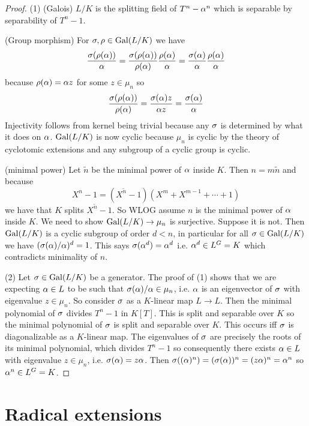 \documentclass{article}
\begin{document}
\begin{proof}
  (1) (Galois)
  $L / K$ is the splitting field of $T^n - \alpha^n$
  which is separable by separability of $T^n - 1$.

  (Group morphism)
  For $\sigma , \rho \in \operatorname{Gal}(L / K)$
  we have \[
    \frac{\sigma(\rho(\alpha))}{\alpha} 
    = \frac{\sigma(\rho(\alpha))}{\rho(\alpha)} \frac{\rho(\alpha)}{\alpha}
    = \frac{\sigma(\alpha)}{\alpha} \frac{\rho(\alpha)}{\alpha}
  \]
  because $\rho(\alpha) = \alpha z$ for some $z \in \mu_n$ so \[
    \frac{\sigma(\rho(\alpha))}{\rho(\alpha)}
    = \frac{\sigma(\alpha) z}{\alpha z} = \frac{\sigma(\alpha)}{\alpha}
  \]
  Injectivity follows from kernel being trivial
  because any $\sigma$ is determined by what it does on $\alpha$.
  $\operatorname{Gal}(L/K)$ is now cyclic because $\mu_n$ is cyclic by
  the theory of cyclotomic extensions and 
  any subgroup of a cyclic group is cyclic.

  (minimal power)
  Let $\tilde{n}$ be the minimal power of $\alpha$ inside $K$.
  Then $n = m \tilde{n}$ and because \[
    X^n - 1 = (X^{\tilde{n}} - 1)(X^m + X^{m - 1} + \cdots + 1)
  \]
  we have that $K$ splits $X^{\tilde{n}} - 1$.
  So WLOG assume $n$ is the minimal power of $\alpha$ inside $K$.
  We need to show $\operatorname{Gal}(L / K) \to \mu_n$ is surjective.
  Suppose it is not.
  Then $\operatorname{Gal}(L / K)$ is a cyclic subgroup of order $d < n$,
  in particular for all $\sigma \in \operatorname{Gal}(L / K)$ we have $(\sigma(\alpha) / \alpha)^d = 1$.
  This says $\sigma(\alpha^d) = \alpha^d$ i.e. $\alpha^d \in L^G = K$
  which contradicts minimality of $n$.

  (2) Let $\sigma \in \operatorname{Gal}(L / K)$ be a generator.
  The proof of (1) shows that we are expecting
  $\alpha \in L$ to be such that $\sigma(\alpha) / \alpha \in \mu_n$,
  i.e. $\alpha$ is an eigenvector of $\sigma$ with eigenvalue $z \in \mu_n$.
  So consider $\sigma$ as a $K$-linear map $L \to L$.
  Then the minimal polynomial of $\sigma$ divides $T^n - 1$ in $K[T]$.
  This is split and separable over $K$ so 
  the minimal polynomial of $\sigma$ is split and separable over $K$.
  This occurs iff $\sigma$ is diagonalizable as a $K$-linear map.
  The eigenvalues of $\sigma$ are precisely the roots of its minimal polynomial,
  which divides $T^n - 1$ so
  consequently there exists $\alpha \in L$ with
  eigenvalue $z \in \mu_n$, i.e. $\sigma(\alpha) = z \alpha$.
  Then $\sigma((\alpha)^n) = (\sigma(\alpha))^n = (z \alpha)^n = \alpha^n$ so $\alpha^n \in L^G = K$.
\end{proof}

\section{Radical extensions}
\end{document}
